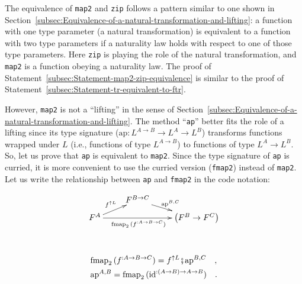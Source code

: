 The equivalence of \lstinline!map2! and \lstinline!zip! follows
a pattern similar to one shown in Section~\ref{subsec:Equivalence-of-a-natural-transformation-and-lifting}:
a function with one type parameter (a natural transformation) is equivalent
to a function with two type parameters if a naturality law holds with
respect to one of those type parameters. Here \lstinline!zip! is
playing the role of the natural transformation, and \lstinline!map2!
is a function obeying a naturality law. The proof of Statement~\ref{subsec:Statement-map2-zip-equivalence}
is similar to the proof of Statement~\ref{subsec:Statement-tr-equivalent-to-ftr}.

However, \lstinline!map2! is not a \textsf{``}lifting\textsf{''} in the sense of
Section~\ref{subsec:Equivalence-of-a-natural-transformation-and-lifting}.
The method \textsf{``}\lstinline!ap!\textsf{''} better fits the role of a lifting
since its type signature ($\text{ap}:L^{A\rightarrow B}\rightarrow L^{A}\rightarrow L^{B}$)
transforms functions wrapped under $L$ (i.e., functions of type $L^{A\rightarrow B}$)
to functions of type $L^{A}\rightarrow L^{B}$. So, let us prove that
\lstinline!ap! is equivalent to \lstinline!map2!. Since the type
signature of \lstinline!ap! is curried, it is more convenient to
use the curried version (\lstinline!fmap2!) instead of \lstinline!map2!.
Let us write the relationship between \lstinline!ap! and \lstinline!fmap2!
in the code notation:%
\begin{comment}
precarious formatting
\end{comment}

\begin{wrapfigure}{i}{0.34\columnwidth}%
\vspace{-1.7\baselineskip}
\[
\xymatrix{\xyScaleY{0.4pc}\xyScaleX{2pc} & F^{B\rightarrow C}\ar[rd]\sp(0.5){\text{ap}^{B,C}}\\
F^{A}\ar[ru]\sp(0.45){f^{\uparrow L}}\ar[rr]\sb(0.43){\text{fmap}_{2}\,(f^{:A\rightarrow B\rightarrow C})} &  & \left(F^{B}\rightarrow F^{C}\right)
}
\]
\vspace{-2\baselineskip}
\end{wrapfigure}%

~\vspace{-0.8\baselineskip}
\begin{align*}
 & \text{fmap}_{2}\,(f^{:A\rightarrow B\rightarrow C})=f^{\uparrow L}\bef\text{ap}^{B,C}\quad,\\
 & \text{ap}^{A,B}=\text{fmap}_{2}\,(\text{id}^{:\left(A\rightarrow B\right)\rightarrow A\rightarrow B})\quad.
\end{align*}

